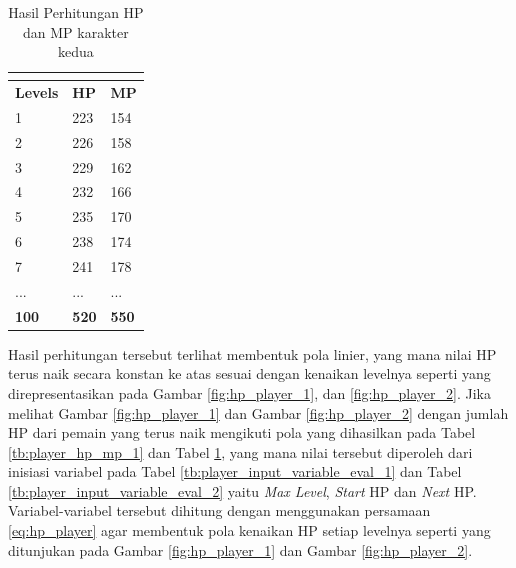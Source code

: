 \begin{longtable}{|l|l|l|}
	\caption{Hasil Perhitungan HP dan MP karakter kedua}
	\vspace{1ex}
	\label{tb:player_hp_mp_2}\\
	\hline
	\rowcolor[HTML]{C0C0C0} 
	\textbf{Levels} & \textbf{HP} & \textbf{MP} \\ \hline
	1 & 223 & 154 \\ \hline
	2 & 226 & 158 \\ \hline
	3 & 229 & 162 \\ \hline
	4 & 232 & 166 \\ \hline
	5 & 235 & 170 \\ \hline
	6 & 238 & 174 \\ \hline
	7 & 241 & 178 \\ \hline
	... & ... & ... \\ \hline
	\textbf{100} & \textbf{520} & \textbf{550} \\ \hline
\end{longtable}
\vspace{1ex}

Hasil perhitungan tersebut terlihat membentuk pola linier, yang mana nilai HP terus naik secara konstan ke atas sesuai dengan kenaikan levelnya seperti yang direpresentasikan pada Gambar \ref{fig:hp_player_1}, dan \ref{fig:hp_player_2}. Jika melihat Gambar \ref{fig:hp_player_1} dan Gambar \ref{fig:hp_player_2} dengan jumlah HP dari pemain yang terus naik mengikuti pola yang dihasilkan pada Tabel \ref{tb:player_hp_mp_1} dan Tabel \ref{tb:player_hp_mp_2}, yang mana nilai tersebut diperoleh dari inisiasi variabel pada Tabel \ref{tb:player_input_variable_eval_1} dan Tabel \ref{tb:player_input_variable_eval_2} yaitu \textit{Max Level}, \textit{Start} HP dan \textit{Next} HP. Variabel-variabel tersebut dihitung dengan menggunakan persamaan \ref{eq:hp_player} agar membentuk pola kenaikan HP setiap levelnya seperti yang ditunjukan pada Gambar \ref{fig:hp_player_1} dan Gambar \ref{fig:hp_player_2}. 
\vspace{1ex}

